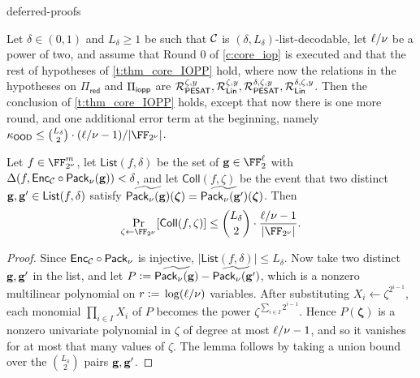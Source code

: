 \begin{lncsappendix}{deferred-proofs}
\begin{theorem}\label{t:thm_core_IOPP_OOD}
Let $\delta\in (0,1)$ and $L_\delta\geq 1$ be such that $\mathcal{C}$ is $(\delta, L_\delta)$-list-decodable, let $\ell/\nu$ be a power of two, and assume that Round 0 of \cref{c:core_iop} is executed and that the rest of hypotheses of \cref{t:thm_core_IOPP} hold, where now the relations in the hypotheses on $\Pi_{\mathsf{red}}$ and $\Pi_{\mathsf{iopp}}$ are $\mathcal{R}_{\mathsf{PESAT}}^{\zeta,y}, \mathcal{R}_{\mathsf{Lin}}^{\zeta,y}, \mathcal{R}_{\mathsf{PESAT}}^{\delta,\zeta,y}, \mathcal{R}_{\mathsf{Lin}}^{\delta,\zeta,y}$. Then the conclusion of \cref{t:thm_core_IOPP} holds, except that now there is one more round, and one additional error term at the beginning, namely $\kappa_{\mathsf{OOD}} \leq \binom{L_\delta}{2}\cdot (\codedim/\comfieldexp-1)/|\comfield|$.
\end{theorem}

\begin{lemma}\label{l:ood_collision}
Let $f\in \comfield^{\codelength}$, let $\mathsf{List}(f,\delta)$ be the set of $\bfg\in \FF_2^{\codedim}$ with $\Delta(f, \mathsf{Enc}_{\mathcal{C}}\circ \mathsf{Pack}_\nu(\mathbf{g}))<\delta$, and let $\mathsf{Coll}(f,\zeta)$ be the event that two distinct $\mathbf{g}, \mathbf{g}'\in \mathsf{List}(f,\delta)$ satisfy ${\widetilde{\mathsf{Pack}_\nu(\mathbf{g})}}(\bm{\zeta}) = {\widetilde{\mathsf{Pack}_\nu(\mathbf{g}')}}(\bm{\zeta})$. Then
%
$$
\Pr_{\zeta\gets \comfield}[\mathsf{Coll}(f,\zeta)] \leq \binom{L_\delta}{2}\cdot \frac{\codedim/\comfieldexp-1}{|\comfield|}.
$$
\end{lemma}
\begin{proof}
Since $\mathsf{Enc}_{\mathcal{C}}\circ \mathsf{Pack}_\nu$ is injective, $|\mathsf{List}(f,\delta)|\leq L_\delta$. Now take two distinct $\mathbf{g}, \mathbf{g}'$ in the list, and let $P{\;\vcentcolon=\;} {\widetilde{\mathsf{Pack}_\nu(\mathbf{g})}}-{\widetilde{\mathsf{Pack}_\nu(\mathbf{g}')}}$, which is a nonzero multilinear polynomial on $r{\;\vcentcolon=\;} \log (\ell/\nu)$ variables. After substituting $X_i \gets \zeta^{2^{i-1}}$, each monomial $\prod_{i\in I} X_i$ of $P$ becomes the power $\zeta^{\sum_{i\in I} 2^{i-1}}$. Hence $P(\bm{\zeta})$ is a nonzero univariate polynomial in $\zeta$ of degree at most $\ell/\nu-1$, and so it vanishes for at most that many values of $\zeta$. The lemma follows by taking a union bound over the $\binom{L_\delta}{2}$ pairs $\mathbf{g},\mathbf{g}'$.
\end{proof}


\end{lncsappendix}
